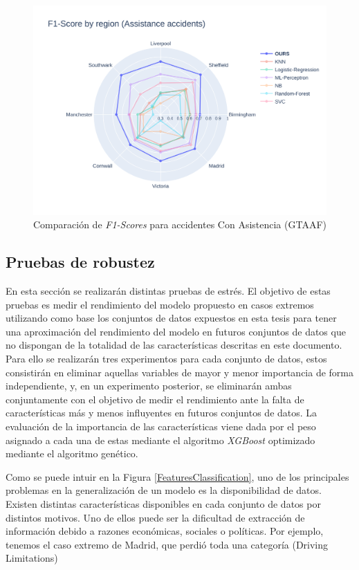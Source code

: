 \begin{figure}[H]
	\centering
	\includegraphics[width=150mm]{Figures/Assistance.png}
	\caption{Comparación de \textit{F1-Scores} para accidentes Con Asistencia (GTAAF)}
	\label{GlobalAssistanceF1Score}
\end{figure}

\subsection{Pruebas de robustez}


En esta sección se realizarán distintas pruebas de estrés. El objetivo de estas pruebas es medir el rendimiento del modelo propuesto en casos extremos utilizando como base los conjuntos de datos expuestos en esta tesis para tener una aproximación del rendimiento del modelo en futuros conjuntos de datos que no dispongan de la totalidad de las características descritas en este documento. Para ello se realizarán tres experimentos para cada conjunto de datos, estos consistirán en eliminar aquellas variables de mayor y menor importancia de forma independiente, y, en un experimento posterior, se eliminarán ambas conjuntamente con el objetivo de medir el rendimiento ante la falta de características más y menos influyentes en futuros conjuntos de datos. La evaluación de la importancia de las características viene dada por el peso asignado a cada una de estas mediante el algoritmo \textit{XGBoost} optimizado mediante el algoritmo genético.


Como se puede intuir en la Figura \ref{FeaturesClassification}, uno de los principales problemas en la generalización de un modelo es la disponibilidad de datos. Existen distintas características disponibles en cada conjunto de datos por distintos motivos. Uno de ellos puede ser la dificultad de extracción de información debido a razones económicas, sociales o políticas. Por ejemplo, tenemos el caso extremo de Madrid, que perdió toda una categoría (Driving Limitations)

